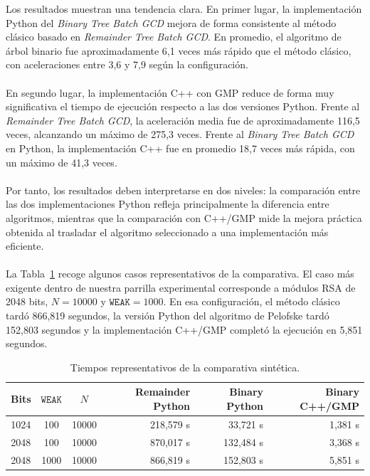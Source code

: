 Los resultados muestran una tendencia clara. En primer lugar, la implementación Python del \textit{Binary Tree Batch GCD} mejora de forma consistente al método clásico basado en \textit{Remainder Tree Batch GCD}. En promedio, el algoritmo de árbol binario fue aproximadamente 6,1 veces más rápido que el método clásico, con aceleraciones entre 3,6 y 7,9 según la configuración.
\\
\\
En segundo lugar, la implementación C++ con GMP reduce de forma muy significativa el tiempo de ejecución respecto a las dos versiones Python. Frente al \textit{Remainder Tree Batch GCD}, la aceleración media fue de aproximadamente 116,5 veces, alcanzando un máximo de 275,3 veces. Frente al \textit{Binary Tree Batch GCD} en Python, la implementación C++ fue en promedio 18,7 veces más rápida, con un máximo de 41,3 veces.
\\
\\
Por tanto, los resultados deben interpretarse en dos niveles: la comparación entre las dos implementaciones Python refleja principalmente la diferencia entre algoritmos, mientras que la comparación con C++/GMP mide la mejora práctica obtenida al trasladar el algoritmo seleccionado a una implementación más eficiente.
\\
\\
La Tabla~\ref{tab:tiempos_representativos} recoge algunos casos representativos de la comparativa. El caso más exigente dentro de nuestra parrilla experimental corresponde a módulos RSA de 2048 bits, \(N=10000\) y \(\texttt{WEAK}=1000\). En esa configuración, el método clásico tardó 866,819 segundos, la versión Python del algoritmo de Pelofske tardó 152,803 segundos y la implementación C++/GMP completó la ejecución en 5,851 segundos.

\begin{table}[htbp]
    \centering
    \small
    \begin{tabular}{|c|c|c|r|r|r|}
        \hline
        Bits & \(\texttt{WEAK}\) & \(N\) & Remainder Python & Binary Python & Binary C++/GMP \\
        \hline
        1024 & 100 & 10000 & 218,579 s & 33,721 s & 1,381 s \\
        2048 & 100 & 10000 & 870,017 s & 132,484 s & 3,368 s \\
        2048 & 1000 & 10000 & 866,819 s & 152,803 s & 5,851 s \\
        \hline
    \end{tabular}
    \caption{Tiempos representativos de la comparativa sintética.}
    \label{tab:tiempos_representativos}
\end{table}

